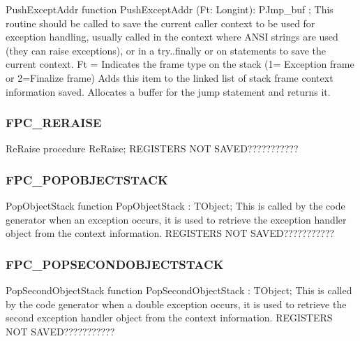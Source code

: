 \documentclass [12pt]{article}
\begin{document}
\begin{function}{PushExceptAddr}
\Declaration
function PushExceptAddr (Ft: Longint): PJmp{\_}buf ;
\Description 
This routine should be called to save the current caller context to be used
for exception handling, usually called in the context where ANSI strings are
used (they can raise exceptions), or in a try..finally or on statements to
save the current context.
\Parameters  
Ft = Indicates the frame type on the stack (1= Exception frame or 2=Finalize
frame)
\Algorithm 
Adds this item to the linked list of stack frame context information saved.
Allocates a buffer for the jump statement and returns it.
\end{function}

\subsubsection{FPC{\_}RERAISE}
\label{subsubsec:mylabel62}

\begin{procedure}{ReRaise}
\Declaration
procedure ReRaise;
\Notes 
REGISTERS NOT SAVED??????????? 
\end{procedure}

\subsubsection{FPC{\_}POPOBJECTSTACK}
\label{subsubsec:mylabel63}

\begin{function}{PopObjectStack}
\Declaration
function PopObjectStack : TObject;
\Description 
This is called by the code generator when an exception occurs, it is used to
retrieve the exception handler object from the context information.
\Notes 
REGISTERS NOT SAVED??????????? 
\end{function}

\subsubsection{FPC{\_}POPSECONDOBJECTSTACK}
\label{subsubsec:mylabel64}

\begin{function}{PopSecondObjectStack}
\Declaration
function PopSecondObjectStack : TObject;
\Description 
This is called by the code generator when a double exception occurs, it is
used to retrieve the second exception handler object from the context
information.
\Notes 
REGISTERS NOT SAVED??????????? 
\end{function}
\end{document}
